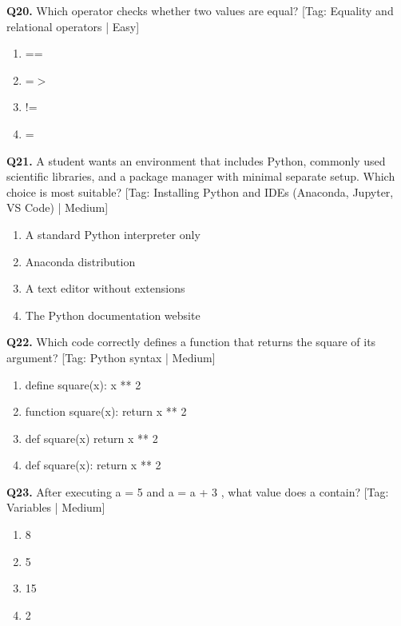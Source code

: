 \vspace{2mm}
\noindent\textbf{Q20.} Which operator checks whether two values are equal? \hfill [Tag: Equality and relational operators | Easy]
\begin{enumerate}[label=(\alph*),topsep=2pt,itemsep=1pt,partopsep=0pt,parsep=0pt]
    \item {==}
    \item {=$>$}
    \item {!=}
    \item {=}
\end{enumerate}
\vspace{2mm}
\noindent\textbf{Q21.} A student wants an environment that includes Python, commonly used scientific libraries, and a package manager with minimal separate setup. Which choice is most suitable? \hfill [Tag: Installing Python and IDEs (Anaconda, Jupyter, VS Code) | Medium]
\begin{enumerate}[label=(\alph*),topsep=2pt,itemsep=1pt,partopsep=0pt,parsep=0pt]
    \item {A standard Python interpreter only}
    \item {Anaconda distribution}
    \item {A text editor without extensions}
    \item {The Python documentation website}
\end{enumerate}
\vspace{2mm}
\noindent\textbf{Q22.} Which code correctly defines a function that returns the square of its argument? \hfill [Tag: Python syntax | Medium]
\begin{enumerate}[label=(\alph*),topsep=2pt,itemsep=1pt,partopsep=0pt,parsep=0pt]
    \item {define square(x): x ** 2}
    \item {function square(x): return x ** 2}
    \item {def square(x) return x ** 2}
    \item {def square(x): return x ** 2}
\end{enumerate}
\vspace{2mm}
\noindent\textbf{Q23.} After executing a = 5 and a = a + 3 , what value does a contain? \hfill [Tag: Variables | Medium]
\begin{enumerate}[label=(\alph*),topsep=2pt,itemsep=1pt,partopsep=0pt,parsep=0pt]
    \item {8}
    \item {5}
    \item {15}
    \item {2}
\end{enumerate}

